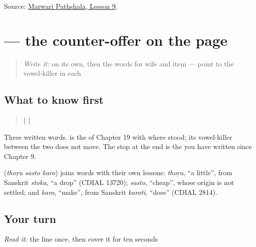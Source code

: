 \begin{tcolorbox}[breakable,colback=teal!4,colframe=teal!35!black,title={Before you move on}]
Source: \href{https://www.marwaripathshala.com/marwari-lesson-9-english}{Marwari Pathshala, Lesson 9}.
\end{tcolorbox}
\section[\texorpdfstring{\mw{थोड़ु} \mw{सस्तो} \mw{करो।} (thoṛu sasto karo.)}{थोड़ु सस्तो करो। (thoṛu sasto karo.)}]{   — the counter-offer on the page}

\label{lesson:MW-C23-bargain-request}



\begin{quote}
\emph{Write it:} \textbf{} on its own, then the words for wife and item — point to the vowel-killer in each
\end{quote}

\subsection*{What to know first}
\begin{quote}
\textbf{ |  | }
\end{quote}

Three written words. \textbf{} is the \textbf{} of Chapter 19 with \textbf{} where \textbf{} stood; its vowel-killer between the two \textbf{} does not move. The stop at the end is the \textbf{} you have written since Chapter 9.

\begin{cousinweb}
\textbf{  } (\emph{thoṛu sasto karo}) joins words with their own lessons: \emph{thoṛu}, \textquotedblleft{}a little\textquotedblright{}, from Sanskrit \emph{stoka}, \textquotedblleft{}a drop\textquotedblright{} (CDIAL 13720); \emph{sasto}, \textquotedblleft{}cheap\textquotedblright{}, whose origin is not settled; and \emph{karo}, \textquotedblleft{}make\textquotedblright{}, from Sanskrit \emph{karoti}, \textquotedblleft{}does\textquotedblright{} (CDIAL 2814).
\end{cousinweb}

\subsection*{Your turn}
\emph{Read it:} the line once, then cover it for ten seconds

